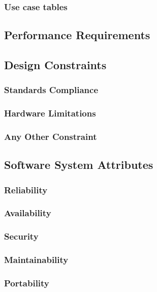 \subsubsection{Use case tables}


\subsection{Performance Requirements}
\subsection{Design Constraints}
\subsubsection{Standards Compliance}
\subsubsection{Hardware Limitations}
\subsubsection{Any Other Constraint}

\subsection{Software System Attributes}
\subsubsection{Reliability}
\subsubsection{Availability}
\subsubsection{Security}
\subsubsection{Maintainability}
\subsubsection{Portability}
